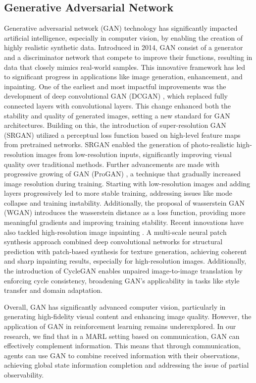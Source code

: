 \subsection{Generative Adversarial Network}

Generative adversarial network (GAN) technology has significantly impacted artificial intelligence, especially in computer vision, by enabling the creation of highly realistic synthetic data. Introduced in 2014, GAN \cite{goodfellow2014generative} consist of a generator and a discriminator network that compete to improve their functions, resulting in data that closely mimics real-world samples. This innovative framework has led to significant progress in applications like image generation, enhancement, and inpainting. One of the earliest and most impactful improvements was the development of deep convolutional GAN (DCGAN) \cite{radford2015unsupervised}, which replaced fully connected layers with convolutional layers. This change enhanced both the stability and quality of generated images, setting a new standard for GAN architectures. Building on this, the introduction of super-resolution GAN (SRGAN) \cite{ledig2017photo} utilized a perceptual loss function based on high-level feature maps from pretrained networks. SRGAN enabled the generation of photo-realistic high-resolution images from low-resolution inputs, significantly improving visual quality over traditional methods. Further advancements are made with progressive growing of GAN (ProGAN) \cite{karras2017progressive}, a technique that gradually increased image resolution during training. Starting with low-resolution images and adding layers progressively led to more stable training, addressing issues like mode collapse and training instability. Additionally, the proposal of wasserstein GAN (WGAN) \cite{adler2018banach} introduces the wasserstein distance as a loss function, providing more meaningful gradients and improving training stability. Recent innovations have also tackled high-resolution image inpainting \cite{yang2017high}. A multi-scale neural patch synthesis approach combined deep convolutional networks for structural prediction with patch-based synthesis for texture generation, achieving coherent and sharp inpainting results, especially for high-resolution images. Additionally, the introduction of CycleGAN \cite{zhu2017unpaired} enables unpaired image-to-image translation by enforcing cycle consistency, broadening GAN's applicability in tasks like style transfer and domain adaptation. 

Overall, GAN has significantly advanced computer vision, particularly in generating high-fidelity visual content and enhancing image quality. However, the application of GAN in reinforcement learning remains underexplored. In our research, we find that in a MARL setting based on communication, GAN can effectively complement information. This means that through communication, agents can use GAN to combine received information with their observations, achieving global state information completion and addressing the issue of partial observability.
